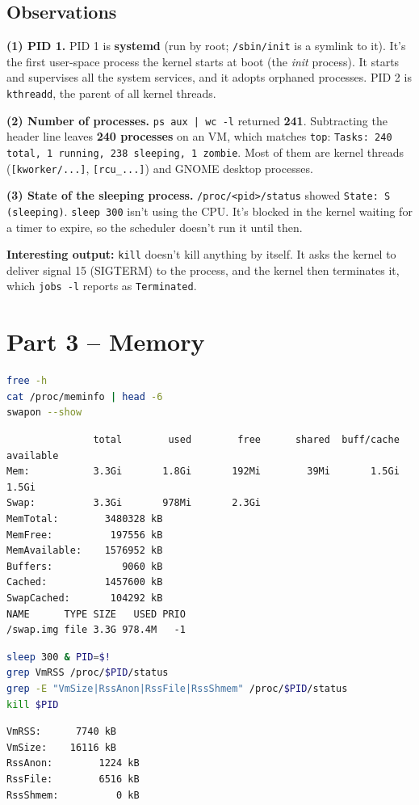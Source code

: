 \documentclass[12pt]{article}
\begin{document}
\subsection*{Observations}
\textbf{(1) PID 1.} PID 1 is \textbf{systemd} (run by root; \texttt{/sbin/init} is a symlink to it). It's the first user-space process the kernel starts at boot (the \emph{init} process). It starts and supervises all the system services, and it adopts orphaned processes. PID 2 is \texttt{kthreadd}, the parent of all kernel threads.

\textbf{(2) Number of processes.} \texttt{ps aux | wc -l} returned \textbf{241}. Subtracting the header line leaves \textbf{240 processes} on an  VM, which matches \texttt{top}: \texttt{Tasks: 240 total, 1 running, 238 sleeping, 1 zombie}. Most of them are kernel threads (\texttt{[kworker/...]}, \texttt{[rcu\_...]}) and GNOME desktop processes.

\textbf{(3) State of the sleeping process.} \texttt{/proc/<pid>/status} showed \texttt{State: S (sleeping)}. \texttt{sleep 300} isn't using the CPU. It's blocked in the kernel waiting for a timer to expire, so the scheduler doesn't run it until then.

\textbf{Interesting output:} \texttt{kill} doesn't kill anything by itself. It asks the kernel to deliver signal 15 (SIGTERM) to the process, and the kernel then terminates it, which \texttt{jobs -l} reports as \texttt{Terminated}.

\section*{Part 3 -- Memory}
\begin{lstlisting}[language=bash]
free -h
cat /proc/meminfo | head -6
swapon --show
\end{lstlisting}
\begin{lstlisting}
               total        used        free      shared  buff/cache   available
Mem:           3.3Gi       1.8Gi       192Mi        39Mi       1.5Gi       1.5Gi
Swap:          3.3Gi       978Mi       2.3Gi
MemTotal:        3480328 kB
MemFree:          197556 kB
MemAvailable:    1576952 kB
Buffers:            9060 kB
Cached:          1457600 kB
SwapCached:       104292 kB
NAME      TYPE SIZE   USED PRIO
/swap.img file 3.3G 978.4M   -1
\end{lstlisting}

\begin{lstlisting}[language=bash]
sleep 300 & PID=$!
grep VmRSS /proc/$PID/status
grep -E "VmSize|RssAnon|RssFile|RssShmem" /proc/$PID/status
kill $PID
\end{lstlisting}
\begin{lstlisting}
VmRSS:	    7740 kB
VmSize:	   16116 kB
RssAnon:	    1224 kB
RssFile:	    6516 kB
RssShmem:	       0 kB
\end{lstlisting}
\end{document}
